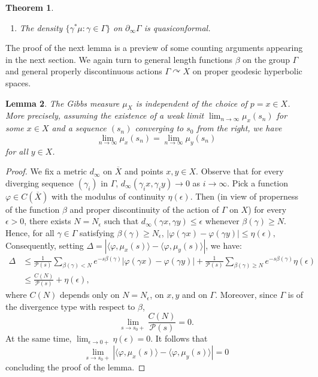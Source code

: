 \documentclass[12pt]{amsbook}%
\newtheorem{thm}{Theorem}[chapter]
\newtheorem{lem}[thm]{Lemma}
\theoremstyle{definition}
\theoremstyle{remark}
\numberwithin{section}{chapter}
\numberwithin{subsection}{section}
\numberwithin{figure}{chapter}
\DeclareMathOperator{\acts}{\curvearrowright}
\def\<{\langle}
\def\>{\rangle}
\def\cP{{\mathscr{P}}}
\def\Ga{\Gamma}
\def\ga{\gamma}
\def\geo{\partial_\infty}
\begin{document}
{{\begin{thm}
\begin{enumerate}
\item The density $\{\ga^* \mu: \ga\in \Ga\}$ on $\geo \Ga$ is quasiconformal. 
\end{enumerate}

\end{thm}




\medskip 
The proof of the next lemma is a preview of some counting arguments appearing in the next section. We again turn to general length functions $\beta$ on the group $\Gamma$ and general properly discontinuous actions $\Ga\acts X$ on proper geodesic hyperbolic spaces.   

\begin{lem} \label{lem_Gibbs_independant_basepoint}
The Gibbs measure $\mu_{X}$ is independent of the choice of $p=x\in X$. More precisely, assuming the existence of a weak limit  
$\lim_{n\to\infty}\mu_x(s_n)$ for some $x\in X$ and a sequence $(s_n)$ converging to $s_0$ from 
the right, we have   
$$\lim_{n\to\infty}\mu_x(s_n)= \lim_{n\to\infty}\mu_y(s_n)$$ 
for all $y\in X$. 
\end{lem}
\begin{proof} We fix a metric $d_\infty$ on $\overline X$ and points $x, y\in X$. Observe that for every diverging sequence $(\gamma_i)$ in $\Gamma$, $d_\infty(\gamma_i x, \gamma_i y)\to 0$ as $i\to\infty$. 
Pick a function $\varphi\in C(\overline{X})$ with the modulus of continuity $\eta(\epsilon)$. Then (in view of properness of the function $\beta$ and proper discontinuity of the action of $\Gamma$ on $X$) 
for every $\epsilon>0$, there exists $N=N_\epsilon$ such that 
$
d_\infty( \gamma x, \gamma y)\leqslant \epsilon$ whenever  $\beta(\gamma)\geqslant N$.
Hence, for all $\gamma\in \Gamma$ satisfying $\beta(\gamma)\geqslant N_\epsilon$, 
$
|\varphi(\gamma x)- \varphi(\gamma y)|\leqslant \eta(\epsilon), 
$
Consequently, setting  $\Delta = |\< \varphi, \mu_x(s)\> - \<\varphi,  \mu_y(s)\>|$, we have:
\begin{align*}
\Delta &\leqslant 
\frac{1}{\cP(s)} \sum_{\beta(\gamma)<N} e^{-s\beta(\gamma)} |\varphi(\gamma x)- \varphi(\gamma y)| + \frac{1}{\cP(s)} \sum_{\beta(\gamma)\geqslant N} e^{-s\beta(\gamma)} \eta(\epsilon) \\
&\leqslant 
 \frac{C(N)}{\cP(s)} + \eta(\epsilon),
\end{align*} 
where $C(N)$ depends only on $N=N_\epsilon$, on $x, y$ and on $\Gamma$. Moreover, since $\Gamma$ is of the divergence type with respect to $\beta$,  
$$
\lim_{s\to s_0+}    \frac{C(N)}{\cP(s)}=0.
$$
 At the same time, $\lim_{\epsilon\to 0+} \eta(\epsilon)=0$. It follows that  
$$
\lim_{s\to s_0+}   |\< \varphi, \mu_x(s)\> - \<\varphi,  \mu_y(s)\>|=0
$$
concluding the proof of the lemma. 
\end{proof}

}}
\end{document}
